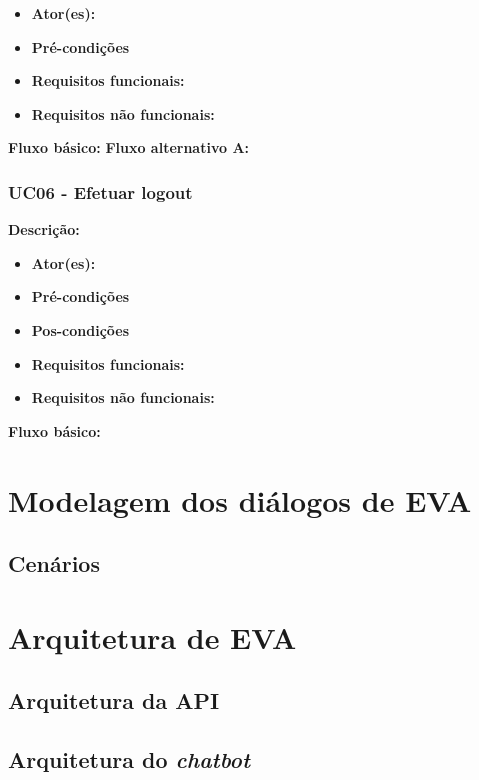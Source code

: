 \begin{itemize}
    \item \textbf{Ator(es):}
    \item \textbf{Pré-condições}
    \item \textbf{Requisitos funcionais:}
    \item \textbf{Requisitos não funcionais:}
\end{itemize}

\textbf{Fluxo básico:}
\textbf{Fluxo alternativo A:}

\subsubsection{UC06 - Efetuar logout}
\textbf{Descrição:}

\begin{itemize}
    \item \textbf{Ator(es):}
    \item \textbf{Pré-condições}
    \item \textbf{Pos-condições}
    \item \textbf{Requisitos funcionais:}
    \item \textbf{Requisitos não funcionais:}
\end{itemize}

\textbf{Fluxo básico:}

\section{Modelagem dos diálogos de EVA}

\subsection{Cenários}

\section{Arquitetura de EVA}

\subsection{Arquitetura da API}

\subsection{Arquitetura do \textit{chatbot}}